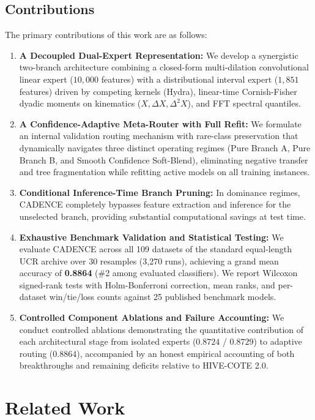 \documentclass[journal,twocolumn]{article}
\begin{document}
\subsection{Contributions}
The primary contributions of this work are as follows:
\begin{enumerate}
    \item \textbf{A Decoupled Dual-Expert Representation:} We develop a synergistic two-branch architecture combining a closed-form multi-dilation convolutional linear expert ($10,000$ features) with a distributional interval expert ($1,851$ features) driven by competing kernels (Hydra), linear-time Cornish-Fisher dyadic moments on kinematics ($X, \Delta X, \Delta^2 X$), and FFT spectral quantiles.
    \item \textbf{A Confidence-Adaptive Meta-Router with Full Refit:} We formulate an internal validation routing mechanism with rare-class preservation that dynamically navigates three distinct operating regimes (Pure Branch A, Pure Branch B, and Smooth Confidence Soft-Blend), eliminating negative transfer and tree fragmentation while refitting active models on all training instances.
    \item \textbf{Conditional Inference-Time Branch Pruning:} In dominance regimes, CADENCE completely bypasses feature extraction and inference for the unselected branch, providing substantial computational savings at test time.
    \item \textbf{Exhaustive Benchmark Validation and Statistical Testing:} We evaluate CADENCE across all 109 datasets of the standard equal-length UCR archive over 30 resamples (3,270 runs), achieving a grand mean accuracy of \textbf{0.8864} (\#2 among evaluated classifiers). We report Wilcoxon signed-rank tests with Holm-Bonferroni correction, mean ranks, and per-dataset win/tie/loss counts against 25 published benchmark models.
    \item \textbf{Controlled Component Ablations and Failure Accounting:} We conduct controlled ablations demonstrating the quantitative contribution of each architectural stage from isolated experts ($0.8724$ / $0.8729$) to adaptive routing ($0.8864$), accompanied by an honest empirical accounting of both breakthroughs and remaining deficits relative to HIVE-COTE 2.0.
\end{enumerate}

\section{Related Work}
\end{document}
